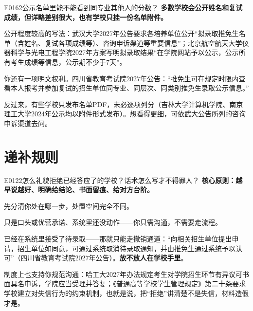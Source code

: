 \begin{qa}{E0162}{公示名单里能不能看到同专业其他人的分数？}
\textbf{多数学校会公开姓名和复试成绩，但详略差别很大，也有学校只挂一份名单附件。}

公开程度较高的写法：武汉大学2027年公告要求各培养单位公开“拟录取推免生名单（含姓名、复试各项成绩等）、咨询申诉渠道等重要信息”；北京航空航天大学仪器科学与光电工程学院2027年方案写明拟录取结果“在学院网站予以公示，公示所有考生成绩等信息，公示期不少于7天”。

你还有一项明文权利。四川省教育考试院2027年公告：“推免生可在规定时限内查看本人报考并参加复试的招生单位同专业、同层次、同类别推免生录取公示信息。”

反过来，有些学校只发布名单PDF，未必逐项列分（吉林大学计算机学院、南京理工大学2024年公示均以附件形式发布）。想看得更细，可依武大公告所列的咨询申诉渠道去问。
\end{qa}

\section{递补规则}
\begin{qa}{E0122}{怎么礼貌拒绝已经答应了的学校？话术怎么写才不得罪人？}
\textbf{核心原则：越早说越好、明确给结论、书面留痕、给对方台阶。}

先分清你处在哪一步，处置空间完全不同。

只是口头或优营承诺、系统里还没动作——你只需沟通，不需要走流程。

已经在系统里接受了待录取——那就只能走撤销通道：“向相关招生单位提出申请，招生单位如同意，可通过系统取消待录取通知，并由推免生通过系统予以认可”（四川省教育考试院2027年公告）。\textbf{放不放人在学校手里}。

制度上也支持你规范沟通：哈工大2027年办法规定考生对学院招生环节有异议可书面具名申诉，学院应当受理并答复；《普通高等学校学生管理规定》第二十条要求学校建立对失信行为的约束机制，也就是说，把“拒绝”讲清楚不是失信，材料造假才是。
\end{qa}

